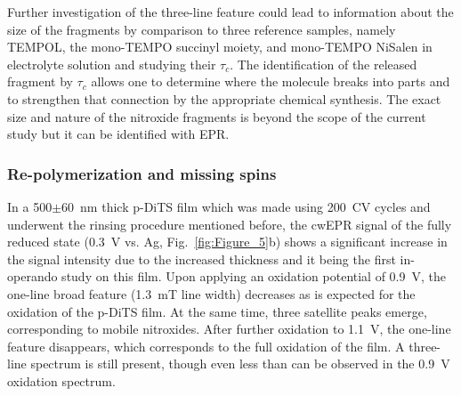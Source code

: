 \par
Further investigation of the three-line feature could lead to information about the size of the fragments by comparison to three reference samples, namely TEMPOL, the mono-TEMPO succinyl moiety, and mono-TEMPO NiSalen in electrolyte solution and studying their $\tau_c$. The identification of the released fragment by $\tau_c$ allows one to determine where the molecule breaks into parts and to strengthen that connection by the appropriate chemical synthesis. The exact size and nature of the nitroxide fragments is beyond the scope of the current study but it can be identified with EPR.


\subsubsection{Re-polymerization and missing spins}
%
In a 500$\pm$60~nm thick p-DiTS film which was made using 200~CV cycles and underwent the rinsing procedure mentioned before, the cwEPR signal of the fully reduced state (0.3~V vs. Ag, Fig.~\ref{fig:Figure_5}b) shows a significant increase in the signal intensity due to the increased thickness and it being the first in-operando study on this film. Upon applying an oxidation potential of 0.9~V, the one-line broad feature (1.3~mT line width) decreases as is expected for the oxidation of the p-DiTS film. At the same time, three satellite peaks emerge, corresponding to mobile nitroxides. After further oxidation to 1.1~V, the one-line feature disappears, which corresponds to the full oxidation of the film. A three-line spectrum is still present, though even less than can be observed in the 0.9~V oxidation spectrum.

